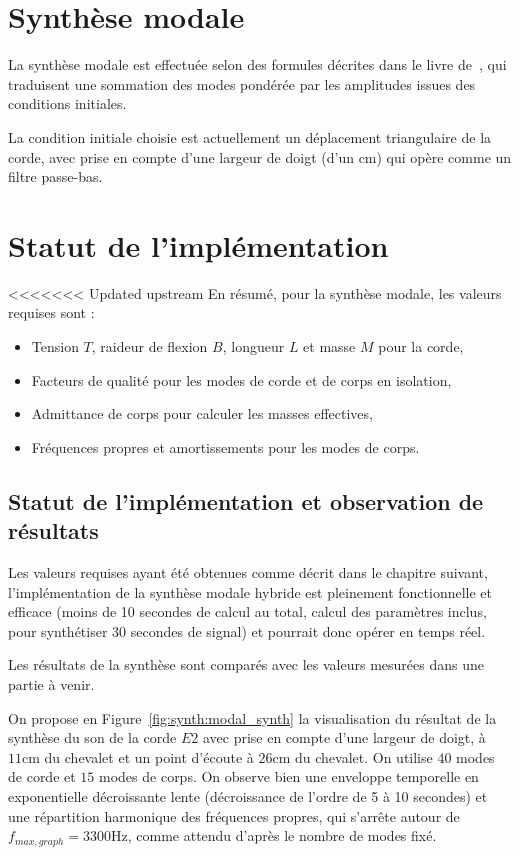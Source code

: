 \section{Synthèse modale}

  La synthèse modale est effectuée selon des formules décrites
dans le livre de~\textcite{newland}, qui traduisent une sommation des modes
pondérée par les amplitudes issues des conditions initiales.

  La condition initiale choisie est actuellement un déplacement triangulaire
de la corde, avec prise en compte d'une largeur de doigt (d'un \( \si{\cm} \))
qui opère comme un filtre passe-bas.

\section{Statut de l'implémentation}

<<<<<<< Updated upstream
En résumé, pour la synthèse modale, les valeurs requises sont :
\begin{itemize}
 \item Tension \( T \), raideur de flexion \( B \), longueur \( L \) et
  masse \( M \) pour la corde,
 \item Facteurs de qualité pour les modes de corde et de corps en isolation,
 \item Admittance de corps pour calculer les masses effectives,
 \item Fréquences propres et amortissements pour les modes de corps.
\end{itemize}

\subsection{Statut de l'implémentation et observation de résultats}

Les valeurs requises ayant été obtenues comme décrit dans le chapitre suivant,
l'implémentation de la synthèse modale hybride est pleinement fonctionnelle
et efficace (moins de 10 secondes de calcul au total, calcul des paramètres
inclus, pour synthétiser 30 secondes de signal) et pourrait donc opérer en
temps réel.

Les résultats de la synthèse sont comparés avec les valeurs mesurées dans une
partie à venir.

On propose en Figure~\ref{fig:synth:modal_synth} la visualisation du résultat
de la synthèse du son de la corde \( E2 \) avec prise en compte d'une largeur
de doigt, à \( \si{11\cm} \) du chevalet et un point d'écoute à
\( \si{26\cm} \) du chevalet.
On utilise \( 40 \) modes de corde et \( 15 \) modes de corps.
On observe bien une enveloppe temporelle en exponentielle décroissante lente
(décroissance de l'ordre de 5 à 10 secondes) et une répartition harmonique
des fréquences propres, qui s'arrête autour de
\( f_{max, graph} = \si{3300\Hz} \), comme attendu d'après le nombre de modes
fixé.


